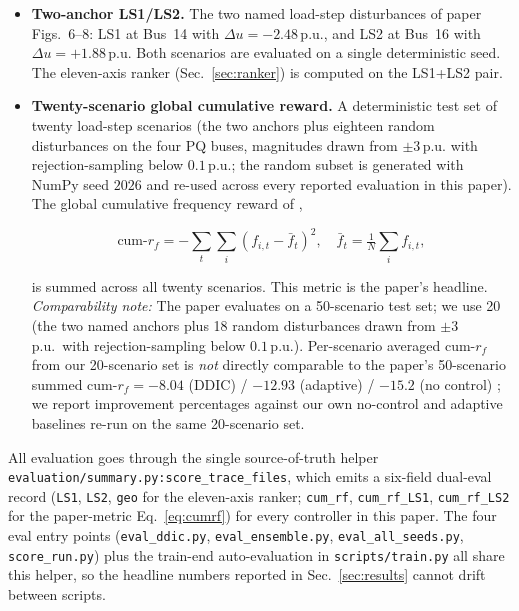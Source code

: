 \documentclass[journal,onecolumn,11pt]{IEEEtran}
\begin{document}
\begin{itemize}
  \item \textbf{Two-anchor LS1/LS2.} The two named load-step
        disturbances of paper Figs.~6--8: LS1 at Bus~14 with
        $\Delta u = -2.48$\,p.u., and LS2 at Bus~16 with
        $\Delta u = +1.88$\,p.u. Both scenarios are evaluated on a
        single deterministic seed. The eleven-axis ranker
        (Sec.~\ref{sec:ranker}) is computed on the LS1+LS2 pair.
  \item \textbf{Twenty-scenario global cumulative reward.}
        A deterministic test set of twenty load-step scenarios
        (the two anchors plus eighteen random disturbances on the
        four PQ buses, magnitudes drawn from $\pm 3$\,p.u. with
        rejection-sampling below $0.1$\,p.u.; the random subset is
        generated with NumPy seed $2026$ and re-used across every
        reported evaluation in this paper). The global cumulative
        frequency reward of \cite[Sec.~IV-C]{yang2023ddic},

        \begin{equation}\label{eq:cumrf}
          \text{cum-}r_f
            = -\sum_t \sum_i (f_{i,t} - \bar{f}_t)^2,
          \quad
          \bar{f}_t = \tfrac{1}{N}\sum_i f_{i,t},
        \end{equation}

        is summed across all twenty scenarios. This metric is the
        paper's headline. \emph{Comparability note:} The paper
        evaluates on a 50-scenario test set; we use 20 (the two
        named anchors plus 18 random disturbances drawn from
        $\pm 3$\,p.u.\ with rejection-sampling below $0.1$\,p.u.).
        Per-scenario averaged cum-$r_f$ from our 20-scenario set is
        \emph{not} directly comparable to the paper's
        50-scenario summed cum-$r_f = -8.04$ (DDIC) /
        $-12.93$ (adaptive) / $-15.2$ (no control)
        \cite[Sec.~IV-C, Fig.~5]{yang2023ddic}; we report
        improvement percentages against our own no-control and
        adaptive baselines re-run on the same 20-scenario set.
\end{itemize}

All evaluation goes through the single source-of-truth helper
\texttt{evaluation/summary.py:score\_trace\_files}, which emits a
six-field dual-eval record (\texttt{LS1}, \texttt{LS2}, \texttt{geo}
for the eleven-axis ranker; \texttt{cum\_rf}, \texttt{cum\_rf\_LS1},
\texttt{cum\_rf\_LS2} for the paper-metric Eq.~\ref{eq:cumrf}) for
every controller in this paper. The four eval entry points
(\texttt{eval\_ddic.py}, \texttt{eval\_ensemble.py},
\texttt{eval\_all\_seeds.py}, \texttt{score\_run.py}) plus the
train-end auto-evaluation in \texttt{scripts/train.py} all share this
helper, so the headline numbers reported in Sec.~\ref{sec:results}
cannot drift between scripts.
\end{document}
